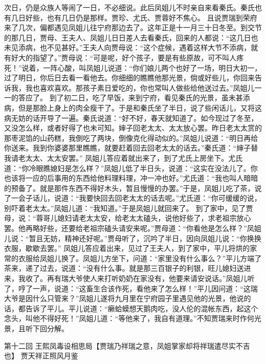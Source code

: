 \documentclass[12pt,oneside]{book}
\begin{document}
次日，仍是众族人等闹了一日，不必细说。此后凤姐儿不时亲自来看秦氏。秦氏也有几日好些，也有几日仍是那样。贾珍、尤氏、贾蓉好不焦心。
且说贾瑞到荣府来了几次，偏都遇见凤姐儿往宁府那边去了。这年正是十一月三十日冬至。到交节的那几日，贾母、王夫人、凤姐儿日日差人去看秦氏，回来的人都说：“这几日也未见添病，也不见甚好。”王夫人向贾母说：“这个症候，遇着这样大节不添病，就有好大的指望了。”贾母说：“可是呢，好个孩子，要是有些原故，可不叫人疼死！”说着，一阵心酸，叫凤姐儿说道：“你们娘儿两个也好了一场，明日大初一，过了明日，你后日去看一看他去。你细细的瞧瞧他那光景，倘或好些儿，你回来告诉我，我也喜欢喜欢。那孩子素日爱吃的，你也常叫人做些给他送过去。”凤姐儿一一的答应了。
到了初二日，吃了早饭，来到宁府，看见秦氏的光景，虽未甚添病，但是那脸上身上的肉全瘦干了。于是和秦氏坐了半日，说了些闲话儿，又将这病无妨的话开导了一遍。秦氏说道：“好不好，春天就知道了。如今现过了冬至，又没怎么样，或者好得了也未可知。婶子回老太太、太太放心罢。昨日老太太赏的那枣泥馅的山药糕，我倒吃了两块，倒像克化得动似的。”凤姐儿说道：“明日再给你送来。我到你婆婆那里瞧瞧，就要赶着回去回老太太的话去。”秦氏道：“婶子替我请老太太、太太安罢。”
凤姐儿答应着就出来了，到了尤氏上房坐下。尤氏道：“你冷眼瞧媳妇是怎么样？”凤姐儿低了半日头，说道：“这实在没法儿了。你也该将一应的后事用的东西给他料理料理，冲一冲也好。”尤氏道：“我也叫人暗暗的预备了。就是那件东西不得好木头，暂且慢慢的办罢。”于是，凤姐儿吃了茶，说了一会子话儿，说道：“我要快回去回老太太的话去呢。”尤氏道：“你可缓缓的说，别吓着老太太。”凤姐儿道：“我知道。”于是凤姐儿就回来了。
到了家中，见了贾母，说：“蓉哥儿媳妇请老太太安，给老太太磕头，说他好些了，求老祖宗放心罢。他再略好些，还要给老祖宗磕头请安来呢。”贾母道：“你看他是怎么样？”凤姐儿说：“暂且无妨，精神还好呢。”贾母听了，沉吟了半日，因向凤姐儿说：“你换换衣服，歇歇去罢。”
凤姐儿答应着出来，见过了王夫人，到了家中，平儿将烘的家常的衣服给凤姐儿换了。凤姐儿方坐下，问道：“家里没有什么事么？”平儿方端了茶来，递了过去，说道：“没有什么事。就是那三百银子的利银，旺儿媳妇送进来，我收了。再有瑞大爷使人来打听奶奶在家没有，他要来请安说话。”凤姐儿听了，哼了一声，说道：“这畜生合该作死，看他来了怎么样！”平儿因问道：“这瑞大爷是因什么只管来？”凤姐儿遂将九月里在宁府园子里遇见他的光景，他说的话，都告诉了平儿。平儿说道：“癞蛤蟆想天鹅肉吃，没人伦的混帐东西，起这个念头，叫他不得好死！”凤姐儿道：“等他来了，我自有道理。”不知贾瑞来时作何光景，且听下回分解。

 
第十二回  王熙凤毒设相思局【贾瑞乃祥瑞之意，凤姐掌家却将祥瑞遣尽实不吉也】
贾天祥正照风月鉴
\end{document}
